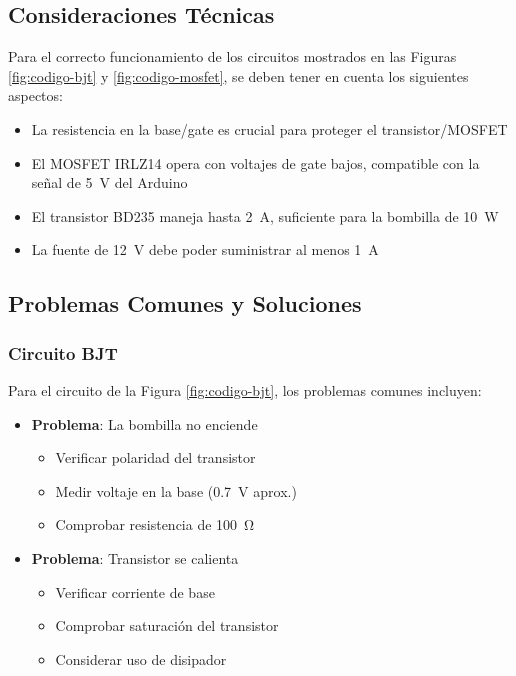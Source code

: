 \subsection{Consideraciones T\'ecnicas}
Para el correcto funcionamiento de los circuitos mostrados en las Figuras \ref{fig:codigo-bjt} y \ref{fig:codigo-mosfet}, se deben tener en cuenta los siguientes aspectos:
\begin{itemize}
	\item La resistencia en la base/gate es crucial para proteger el transistor/MOSFET
	\item El MOSFET IRLZ14 opera con voltajes de gate bajos, compatible con la se\~nal de \SI{5}{\volt} del Arduino
	\item El transistor BD235 maneja hasta \SI{2}{\ampere}, suficiente para la bombilla de \SI{10}{\watt}
	\item La fuente de \SI{12}{\volt} debe poder suministrar al menos \SI{1}{\ampere}
\end{itemize}

\subsection{Problemas Comunes y Soluciones}

\subsubsection{Circuito BJT}
Para el circuito de la Figura \ref{fig:codigo-bjt}, los problemas comunes incluyen:
\begin{itemize}
	\item \textbf{Problema}: La bombilla no enciende
	\begin{itemize}
		\item Verificar polaridad del transistor
		\item Medir voltaje en la base (\SI{0.7}{\volt} aprox.)
		\item Comprobar resistencia de \SI{100}{\ohm}
	\end{itemize}
	
	\item \textbf{Problema}: Transistor se calienta
	\begin{itemize}
		\item Verificar corriente de base
		\item Comprobar saturaci\'on del transistor
		\item Considerar uso de disipador
	\end{itemize}
\end{itemize}

